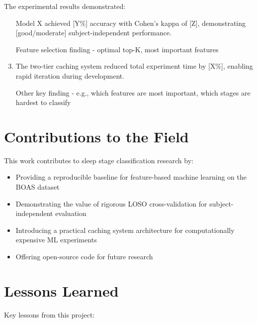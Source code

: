 The experimental results demonstrated:

\begin{enumerate}
    \item [Model X] achieved [Y\%] accuracy with Cohen's kappa of [Z], demonstrating [good/moderate] subject-independent performance.

    \item [Feature selection finding - optimal top-K, most important features]

    \item The two-tier caching system reduced total experiment time by [X\%], enabling rapid iteration during development.

    \item [Other key finding - e.g., which features are most important, which stages are hardest to classify]
\end{enumerate}

\section{Contributions to the Field}
\label{sec:contributions_field}

This work contributes to sleep stage classification research by:

\begin{itemize}
    \item Providing a reproducible baseline for feature-based machine learning on the BOAS dataset
    \item Demonstrating the value of rigorous LOSO cross-validation for subject-independent evaluation
    \item Introducing a practical caching system architecture for computationally expensive ML experiments
    \item Offering open-source code for future research
\end{itemize}

\section{Lessons Learned}
\label{sec:lessons_learned}

Key lessons from this project:

